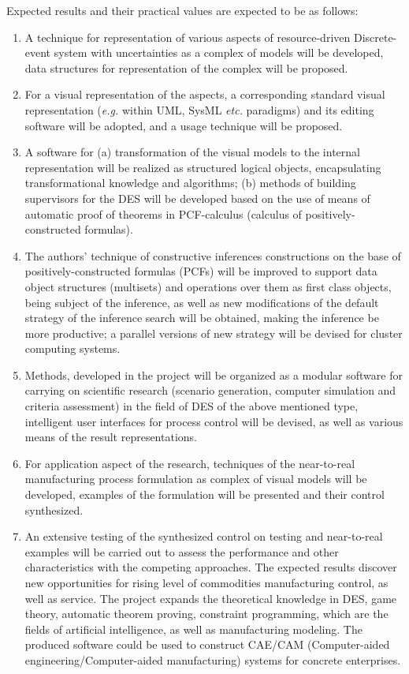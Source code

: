 \documentclass[runningheads]{llncs}
\begin{document}
Expected results and their practical values are expected to be as follows:
\begin{enumerate}
\item A technique for representation of various aspects of resource-driven Discrete-event system with uncertainties as a complex of models will be developed, data structures for representation of the complex will be proposed.
\item For a visual representation of the aspects, a corresponding standard visual representation (\emph{e.g.} within UML, SysML \emph{etc.} paradigms) and its editing software will be adopted, and a usage technique will be proposed.
\item A software for (a) transformation of the visual models to the internal representation will be realized as structured logical objects, encapsulating transformational knowledge and algorithms; (b) methods of building supervisors for the DES will be developed based on the use of means of automatic proof of theorems in PCF-calculus (calculus of positively-constructed formulas).
\item The authors’ technique of constructive inferences constructions on the base of positively-constructed formulas (PCFs) will be improved to support data object structures (multisets) and operations over them as first class objects, being subject of the inference, as well as new modifications of the default strategy of the inference search will be obtained, making the inference be more productive; a parallel versions of new strategy will be devised for cluster computing systems.
\item Methods, developed in the project will be organized as a modular software for carrying on scientific research (scenario generation, computer simulation and criteria assessment) in the field of DES of the above mentioned type, intelligent user interfaces for process control will be devised, as well as various means of the result representations.
\item For application aspect of the research, techniques of the near-to-real manufacturing process formulation as complex of visual models will be developed, examples of the formulation will be presented and their control synthesized.
\item An extensive testing of the synthesized control on testing and near-to-real examples will be carried out to assess the performance and other characteristics with the competing approaches.  The expected results discover new opportunities for rising level of commodities manufacturing control, as well as service. The project expands the theoretical knowledge in DES, game theory, automatic theorem proving, constraint programming, which are the fields of artificial intelligence, as well as manufacturing modeling. The produced software could be used to construct CAE/CAM (Computer-aided engineering/Computer-aided manufacturing) systems for concrete enterprises.
\end{enumerate}
\end{document}
